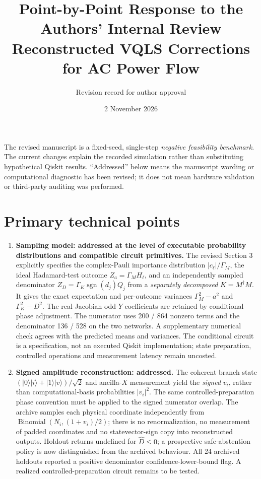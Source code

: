 \documentclass[11pt,a4paper]{article}
\title{Point-by-Point Response to the Authors' Internal Review\\[2mm]\large Reconstructed VQLS Corrections for AC Power Flow}
\author{Revision record for author approval}
\date{2 November 2026}
\begin{document}
\maketitle
\noindent The revised manuscript is a fixed-seed, single-step \emph{negative feasibility benchmark}. The current changes explain the recorded simulation rather than substituting hypothetical Qiskit results. ``Addressed'' below means the manuscript wording or computational diagnostic has been revised; it does not mean hardware validation or third-party auditing was performed.

\section*{Primary technical points}
\begin{enumerate}
\item \textbf{Sampling model: addressed at the level of executable probability distributions and compatible circuit primitives.} The revised Section 3 explicitly specifies the complex-Pauli importance distribution $|c_\ell|/\Gamma_M$, the ideal Hadamard-test outcome $Z_a=\Gamma_M H_\ell$, and an independently sampled denominator $Z_D=\Gamma_K\operatorname{sgn}(d_j)Q_j$ from a \emph{separately decomposed} $K=M^\dagger M$. It gives the exact expectation and per-outcome variances $\Gamma_M^2-a^2$ and $\Gamma_K^2-D^2$. The real-Jacobian odd-$Y$ coefficients are retained by conditional phase adjustment. The numerator uses 200 / 864 nonzero terms and the denominator 136 / 528 on the two networks. A supplementary numerical check agrees with the predicted means and variances. The conditional circuit is a specification, not an executed Qiskit implementation; state preparation, controlled operations and measurement latency remain uncosted.

\item \textbf{Signed amplitude reconstruction: addressed.} The coherent branch state $(|0\rangle|i\rangle+|1\rangle|v\rangle)/\sqrt2$ and ancilla-$X$ measurement yield the \emph{signed} $v_i$, rather than computational-basis probabilities $|v_i|^2$. The same controlled-preparation phase convention must be applied to the signed numerator overlap. The archive samples each physical coordinate independently from $\operatorname{Binomial}(N_i,(1+v_i)/2)$; there is no renormalization, no measurement of padded coordinates and no statevector-sign copy into reconstructed outputs. Holdout returns undefined for $\widehat D\le0$; a prospective safe-abstention policy is now distinguished from the archived behaviour. All 24 archived holdouts reported a positive denominator confidence-lower-bound flag. A realized controlled-preparation circuit remains to be tested.


\end{enumerate}
\end{document}
